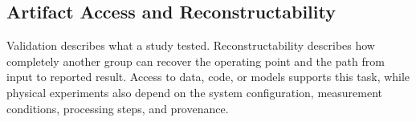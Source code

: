 %
%
%
%
%
%
%

\subsection{Artifact Access and Reconstructability}

Validation describes what a study tested. Reconstructability describes how
completely another group can recover the operating point and the path from
input to reported result. Access to data, code, or models supports this task,
while physical experiments also depend on the system configuration,
measurement conditions, processing steps, and provenance.

